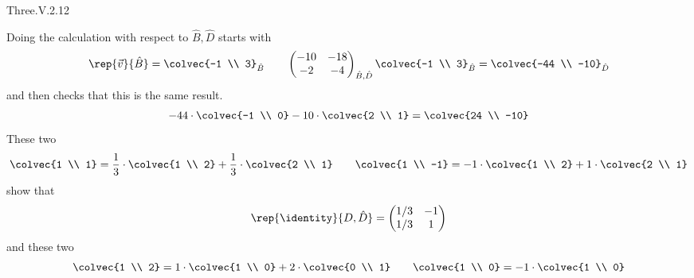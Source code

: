 \begin{ans}{Three.V.2.12}
\begin{exparts}
\begin{equation*}
          \end{equation*}
          Doing the calculation with respect to $\hat{B},\hat{D}$ starts with
          \begin{equation*}
            \rep{\vec{v}}{\hat{B}}=\colvec{-1 \\ 3}_{\hat{B}}
            \qquad
            \begin{pmatrix}
              -10  &-18  \\
               -2  &-4
            \end{pmatrix}_{\hat{B},\hat{D}}
            \colvec{-1 \\ 3}_{\hat{B}}
            =\colvec{-44 \\ -10}_{\hat{D}}
          \end{equation*}
          and then checks that this is the same result.
          \begin{equation*}
            -44\cdot\colvec{-1 \\ 0}-10\cdot\colvec{2 \\ 1}=\colvec{24 \\ -10}
          \end{equation*}
    \partsitem These two
      \begin{equation*}
        \colvec{1 \\ 1}=\frac{1}{3}\cdot\colvec{1 \\ 2}
                  +\frac{1}{3}\cdot\colvec{2 \\ 1}
        \qquad
        \colvec{1 \\ -1}=-1\cdot\colvec{1 \\ 2}
                  +1\cdot\colvec{2 \\ 1}
      \end{equation*}
      show that
      \begin{equation*}
        \rep{\identity}{D,\hat{D}}=\begin{pmatrix}
          1/3  &-1  \\
          1/3  &1
        \end{pmatrix}
      \end{equation*}
      and these two
      \begin{equation*}
        \colvec{1 \\ 2}=1\cdot\colvec{1 \\ 0}
                  +2\cdot\colvec{0 \\ 1}
        \qquad
        \colvec{1 \\ 0}=-1\cdot\colvec{1 \\ 0}

\end{equation*}
\end{exparts}
\end{ans}
